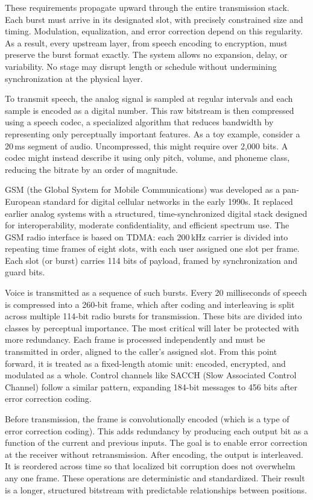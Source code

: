 These requirements propagate upward through the entire transmission stack. Each burst must arrive in its designated slot, with precisely constrained size and timing. Modulation, equalization, and error correction depend on this regularity. As a result, every upstream layer, from speech encoding to encryption, must preserve the burst format exactly. The system allows no expansion, delay, or variability. No stage may disrupt length or schedule without undermining synchronization at the physical layer.

To transmit speech, the analog signal is sampled at regular intervals and each sample is encoded as a digital number. This raw bitstream is then compressed using a speech codec, a specialized algorithm that reduces bandwidth by representing only perceptually important features. As a toy example, consider a 20 ms segment of audio. Uncompressed, this might require over 2,000 bits. A codec might instead describe it using only pitch, volume, and phoneme class, reducing the bitrate by an order of magnitude.

GSM (the Global System for Mobile Communications) was developed as a pan-European standard for digital cellular networks in the early 1990s. It replaced earlier analog systems with a structured, time-synchronized digital stack designed for interoperability, moderate confidentiality, and efficient spectrum use. The GSM radio interface is based on TDMA: each 200 kHz carrier is divided into repeating time frames of eight slots, with each user assigned one slot per frame. Each slot (or burst) carries 114 bits of payload, framed by synchronization and guard bits.

Voice is transmitted as a sequence of such bursts. Every 20 milliseconds of speech is compressed into a 260-bit frame, which after coding and interleaving is split across multiple 114-bit radio bursts for transmission. These bits are divided into classes by perceptual importance. The most critical will later be protected with more redundancy. Each frame is processed independently and must be transmitted in order, aligned to the caller’s assigned slot. From this point forward, it is treated as a fixed-length atomic unit: encoded, encrypted, and modulated as a whole. Control channels like SACCH (Slow Associated Control Channel) follow a similar pattern, expanding 184-bit messages to 456 bits after error correction coding.

Before transmission, the frame is convolutionally encoded (which is a type of error correction coding). This adds redundancy by producing each output bit as a function of the current and previous inputs. The goal is to enable error correction at the receiver without retransmission. After encoding, the output is interleaved. It is reordered across time so that localized bit corruption does not overwhelm any one frame. These operations are deterministic and standardized. Their result is a longer, structured bitstream with predictable relationships between positions.

